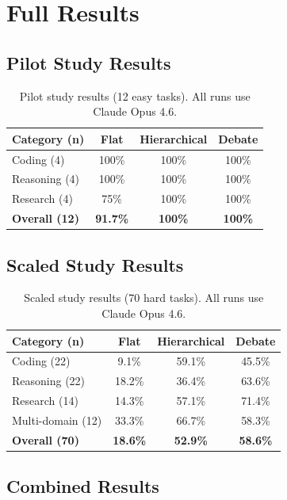 \section{Full Results}\label{app:full-results}

\subsection{Pilot Study Results}\label{app:pilot-results}

\begin{table}[ht]
\centering
\caption{Pilot study results (12 easy tasks). All runs use Claude Opus 4.6.}
\small
\begin{tabular}{lccc}
\toprule
Category (n) & Flat & Hierarchical & Debate \\
\midrule
Coding (4) & 100\% & 100\% & 100\% \\
Reasoning (4) & 100\% & 100\% & 100\% \\
Research (4) & 75\% & 100\% & 100\% \\
\midrule
\textbf{Overall (12)} & \textbf{91.7\%} & \textbf{100\%} & \textbf{100\%} \\
\bottomrule
\end{tabular}
\end{table}

\subsection{Scaled Study Results}\label{app:scaled-results}

\begin{table}[ht]
\centering
\caption{Scaled study results (70 hard tasks). All runs use Claude Opus 4.6.}
\small
\begin{tabular}{lccc}
\toprule
Category (n) & Flat & Hierarchical & Debate \\
\midrule
Coding (22) & 9.1\% & 59.1\% & 45.5\% \\
Reasoning (22) & 18.2\% & 36.4\% & 63.6\% \\
Research (14) & 14.3\% & 57.1\% & 71.4\% \\
Multi-domain (12) & 33.3\% & 66.7\% & 58.3\% \\
\midrule
\textbf{Overall (70)} & \textbf{18.6\%} & \textbf{52.9\%} & \textbf{58.6\%} \\
\bottomrule
\end{tabular}
\end{table}

\subsection{Combined Results}\label{app:combined-results}

